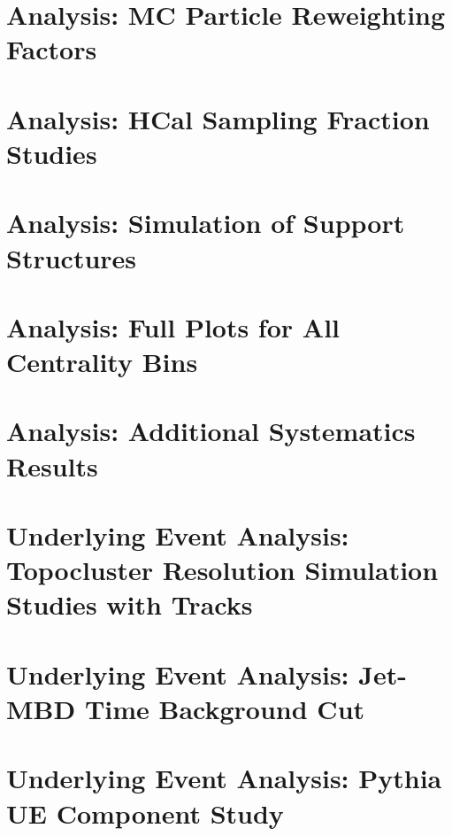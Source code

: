 \begin{appendices}



\chapter{\detdeta Analysis: MC Particle Reweighting Factors}
\label{sec:MC_particle_ratios}


\chapter{\detdeta Analysis: HCal Sampling Fraction Studies}
\label{sec:SamplingFrac}


\chapter{\detdeta Analysis: Simulation of Support Structures} 
\label{sec:SupportStruct}


\chapter{\detdeta Analysis: Full Plots for All Centrality Bins}
\label{sec:full_detdeta_plots}
 

\chapter{\detdeta Analysis: Additional Systematics Results}
\label{sec:detdeta_add_syst}


\chapter{Underlying Event Analysis: Topocluster Resolution Simulation Studies with Tracks}
\label{sec:additional_topo_reso}


\chapter{Underlying Event Analysis: Jet-MBD Time Background Cut}
\label{sec:jet_mbd_time_bkg_cut}


\chapter{Underlying Event Analysis: Pythia UE Component Study}
\label{sec:pythia_ue_study}


\end{appendices}
